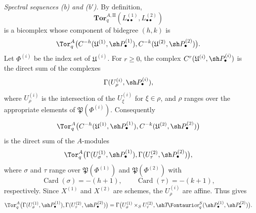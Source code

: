 \begin{env}[6.6.4]
\label{III.6.6.4}
\emph{Spectral sequences \textnormal{(b)} and
\textnormal{(b$'$)}.}
By definition,
\[
  \mathbf{Tor}_q^{A,\mathrm{II}}
  (L_{\bullet\bullet}^{(1)},L_{\bullet\bullet}^{(2)})
\]
is a bicomplex whose component of bidegree $(h,k)$ is
\[
  \Tor_q^A
  \bigl(
    C^{-h}(\mathfrak U^{(1)},\sh P_\bullet^{(1)}),
    C^{-k}(\mathfrak U^{(2)},\sh P_\bullet^{(2)})
  \bigr).
\]
Let $\Phi^{(i)}$ be the index set of $\mathfrak U^{(i)}$.  For
$r\geq0$, the complex
$C^r(\mathfrak U^{(i)},\sh P_\bullet^{(i)})$ is the direct sum
of the complexes
\[
  \Gamma(U_\rho^{(i)},\sh P_\bullet^{(i)}),
\]
where $U_\rho^{(i)}$ is the intersection of the
$U_\xi^{(i)}$ for $\xi\in\rho$, and $\rho$ ranges over the
appropriate elements of $\mathfrak P(\Phi^{(i)})$.
Consequently
\[
  \Tor_q^A
  \bigl(
    C^{-h}(\mathfrak U^{(1)},\sh P_\bullet^{(1)}),
    C^{-k}(\mathfrak U^{(2)},\sh P_\bullet^{(2)})
  \bigr)
\]
is the direct sum of the $A$-modules
\[
  \Tor_q^A
  \bigl(
    \Gamma(U_\sigma^{(1)},\sh P_\bullet^{(1)}),
    \Gamma(U_\tau^{(2)},\sh P_\bullet^{(2)})
  \bigr),
\]
where $\sigma$ and $\tau$ range over
$\mathfrak P(\Phi^{(1)})$ and $\mathfrak P(\Phi^{(2)})$ with
\[
  \operatorname{Card}(\sigma)=-(h+1),
  \qquad
  \operatorname{Card}(\tau)=-(k+1),
\]
respectively.  Since $X^{(1)}$ and $X^{(2)}$ are schemes, the
$U_\rho^{(i)}$ are affine.  Thus  gives
\[
  \Tor_q^A
  \bigl(
    \Gamma(U_\sigma^{(1)},\sh P_\bullet^{(1)}),
    \Gamma(U_\tau^{(2)},\sh P_\bullet^{(2)})
  \bigr)
  =
  \Gamma\bigl(
    U_\sigma^{(1)}\times_SU_\tau^{(2)},
    \shTor_q^S(\sh P_\bullet^{(1)},\sh P_\bullet^{(2)})
  \bigr).
\]


\end{env}
